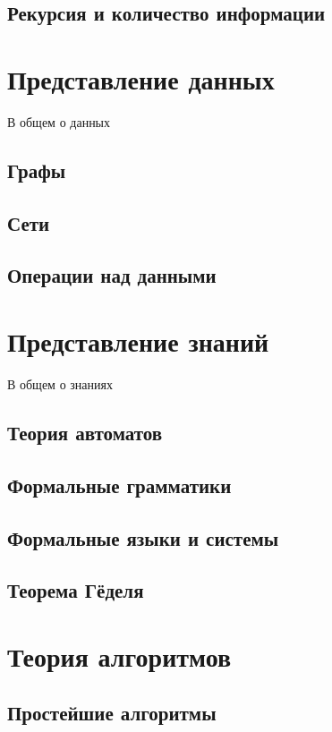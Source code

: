 \documentclass[b5paper,11pt]{book}
\begin{document}
	\section{Рекурсия и количество информации}
	
	
	\chapter{Представление данных}
	В общем о данных
	
	\section{Графы}
	
	\section{Сети}
	
	\section{Операции над данными}
	
	\chapter{Представление знаний}
	В общем о знаниях
	
	\section{Теория автоматов}
	\section{Формальные грамматики}
	\section{Формальные языки и системы}
	\section{Теорема Гёделя}
	
	\chapter{Теория алгоритмов}
	
	\section{Простейшие алгоритмы}
\end{document}
